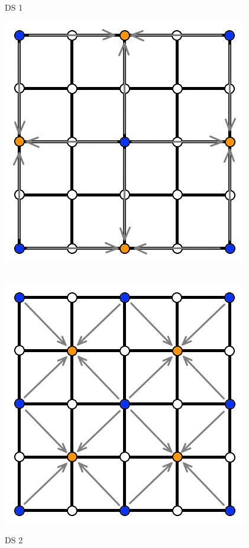\documentclass[11pt,a4paper,twoside,openright]{report}
\begin{document}
\begin{figure}[!htb]
  \caption{DS 1}\label{fig:ds2}
\endminipage
{}%
  \includegraphics[width=\linewidth]{ds3.png}
  \caption{DS 2}\label{fig:ds3}
\endminipage\hfill
\\
\centering
{}
  \includegraphics[width=\linewidth]{ds4.png}

\end{figure}
\end{document}
